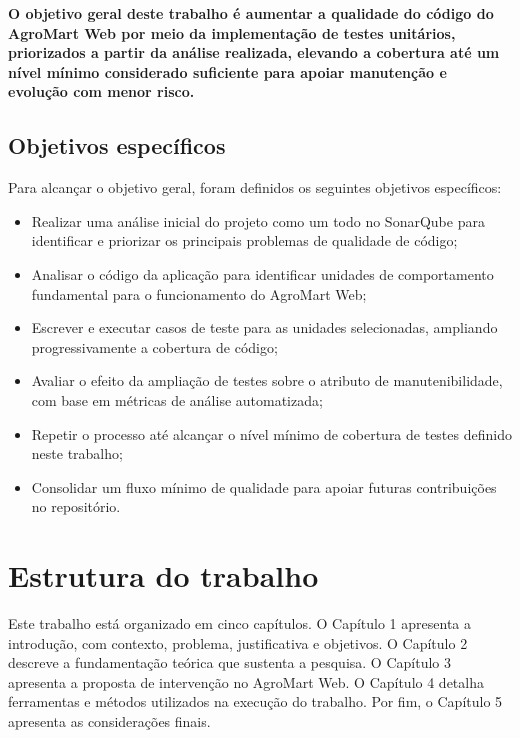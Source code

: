 \textbf{O objetivo geral deste trabalho é aumentar a qualidade do código do AgroMart Web por meio da implementação de testes unitários, priorizados a partir da análise realizada, elevando a cobertura até um nível mínimo considerado suficiente para apoiar manutenção e evolução com menor risco.}

\subsection{Objetivos específicos}

Para alcançar o objetivo geral, foram definidos os seguintes objetivos específicos:

\begin{itemize}
	\item Realizar uma análise inicial do projeto como um todo no SonarQube para identificar e priorizar os principais problemas de qualidade de código;
	\item Analisar o código da aplicação para identificar unidades de comportamento fundamental para o funcionamento do AgroMart Web;
	\item Escrever e executar casos de teste para as unidades selecionadas, ampliando progressivamente a cobertura de código;
	\item Avaliar o efeito da ampliação de testes sobre o atributo de manutenibilidade, com base em métricas de análise automatizada;
	\item Repetir o processo até alcançar o nível mínimo de cobertura de testes definido neste trabalho;
	\item Consolidar um fluxo mínimo de qualidade para apoiar futuras contribuições no repositório.
\end{itemize}

\section{Estrutura do trabalho}

Este trabalho está organizado em cinco capítulos. O Capítulo 1 apresenta a introdução, com contexto, problema, justificativa e objetivos.
O Capítulo 2 descreve a fundamentação teórica que sustenta a pesquisa. O Capítulo 3 apresenta a proposta de intervenção no AgroMart Web.
O Capítulo 4 detalha ferramentas e métodos utilizados na execução do trabalho. Por fim, o Capítulo 5 apresenta as considerações finais.
